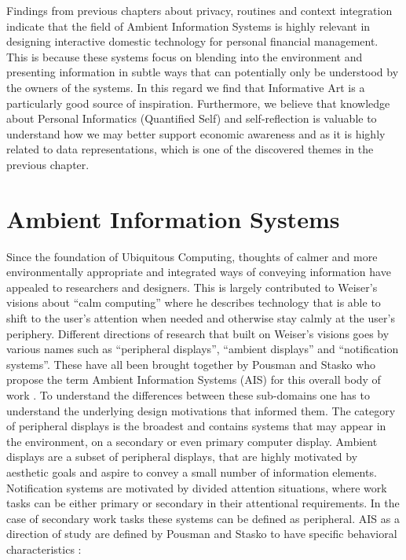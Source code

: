 Findings from previous chapters about privacy, routines and context integration indicate that the field of Ambient Information Systems is highly relevant in designing interactive domestic technology for personal financial management. This is because these systems focus on blending into the environment and presenting information in subtle ways that can potentially only be understood by the owners of the systems. In this regard we find that Informative Art is a particularly good source of inspiration. Furthermore, we believe that knowledge about Personal Informatics (Quantified Self) and self-reflection is valuable to understand how we may better support economic awareness and as it is highly related to data representations, which is one of the discovered themes in the previous chapter.

\section{Ambient Information Systems}
Since the foundation of Ubiquitous Computing, thoughts of calmer and more environmentally appropriate and integrated ways of conveying information have appealed to researchers and designers. This is largely contributed to Weiser’s visions about “calm computing” \cite{weiser1997coming} where he describes technology that is able to shift to the user’s attention when needed and otherwise stay calmly at the user’s periphery. Different directions of research that built on Weiser’s visions goes by various names such as “peripheral displays”, “ambient displays” and “notification systems”. These have all been brought together by Pousman and Stasko who propose the term Ambient Information Systems (AIS) for this overall body of work \cite{pousman2006taxonomy}. To understand the differences between these sub-domains one has to understand the underlying design motivations that informed them. The category of peripheral displays is the broadest and contains systems that may appear in the environment, on a secondary or even primary computer display. Ambient displays are a subset of peripheral displays, that are highly motivated by aesthetic goals and aspire to convey a small number of information elements. Notification systems are motivated by divided attention situations, where work tasks can be either primary or secondary in their attentional requirements. In the case of secondary work tasks these systems can be defined as peripheral.
AIS as a direction of study are defined by Pousman and Stasko to have specific behavioral characteristics \cite{pousman2006taxonomy}:

